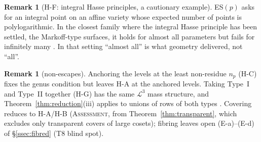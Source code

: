 \documentclass[10pt,reqno]{amsart}
\theoremstyle{definition}
\newtheorem{remark}[theorem]{Remark}
\numberwithin{equation}{section}
\newcommand{\cL}{\mathcal L}
\newcommand{\status}[1]{\textup{\textsc{#1}}}
\begin{document}
\begin{remark}[H-F: integral Hasse principles, a cautionary example]
ES$(p)$ asks for an integral point on an affine variety whose expected
number of points is polylogarithmic. In the closest family where the
integral Hasse principle has been settled, the Markoff-type surfaces, it
holds for almost all parameters but fails for infinitely many
\cite[Thm.~1.2]{GS}. In that setting ``almost all'' is what geometry
delivered, not ``all''.
\end{remark}

\begin{remark}[non-escapes]
Anchoring the levels at the least non-residue $n_p$ (H-C) fixes the genus
condition but leaves H-A at the anchored levels. Taking Type~I and Type~II
together (H-G) has the same $\cL^3$ mass structure, and
Theorem~\ref{thm:reduction}(iii) applies to unions of rows of both types
\cite[\S3]{RT2}. Covering reduces to H-A/H-B (\status{Assessment}, from
Theorem~\ref{thm:transparent}, which excludes only transparent covers of large cosets);
fibring leaves open (E-a)--(E-d) of \S\ref{ssec:fibred} (T8 blind spot).
\end{remark}
\end{document}
